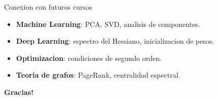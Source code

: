 \documentclass[aspectratio=169, 10pt, xcolor=table]{beamer}
\begin{document}
\begin{frame}{Conexion con futuros cursos}
    \begin{itemize}
        \item \textbf{Machine Learning}: PCA, SVD, analisis de componentes.
        \item \textbf{Deep Learning}: espectro del Hessiano, inicializacion de pesos.
        \item \textbf{Optimizacion}: condiciones de segundo orden.
        \item \textbf{Teoria de grafos}: PageRank, centralidad espectral.
    \end{itemize}
\end{frame}

\begin{frame}
    \centering
    \Huge \textbf{Gracias!}

\end{frame}
\end{document}
